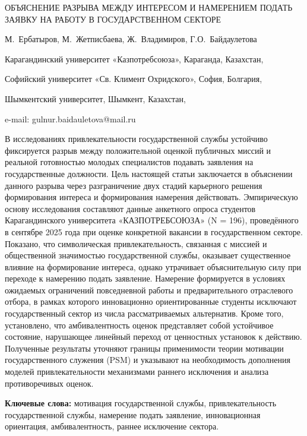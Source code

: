 \begin{header}
ОБЪЯСНЕНИЕ РАЗРЫВА МЕЖДУ ИНТЕРЕСОМ И НАМЕРЕНИЕМ ПОДАТЬ ЗАЯВКУ НА РАБОТУ В ГОСУДАРСТВЕННОМ СЕКТОРЕ

М.~Ербатыров,
М.~Жетписбаева,
Ж.~Владимиров,
Г.О.~Байдаулетова\envelope
\end{header}

\begin{affil}
Карагандинский университет «Казпотребсоюза», Караганда, Казахстан,

Софийский университет «Св. Климент Охридского», София, Болгария,

Шымкентский университет, Шымкент, Казахстан,

e-mail: gulnur.baidauletova@mail.ru
\end{affil}

В исследованиях привлекательности государственной службы устойчиво
фиксируется разрыв между положительной оценкой публичных миссий и
реальной готовностью молодых специалистов подавать заявления на
государственные должности. Цель настоящей статьи заключается в
объяснении данного разрыва через разграничение двух стадий карьерного
решения формирования интереса и формирования намерения действовать.
Эмпирическую основу исследования составляют данные анкетного опроса
студентов Карагандинского университета «КАЗПОТРЕБСОЮЗА» (N = 196),
проведённого в сентябре 2025 года при оценке конкретной вакансии в
государственном секторе. Показано, что символическая привлекательность,
связанная с миссией и общественной значимостью государственной службы,
оказывает существенное влияние на формирование интереса, однако
утрачивает объяснительную силу при переходе к намерению подать
заявление. Намерение формируется в условиях ожидаемых ограничений
повседневной работы и предварительного отраслевого отбора, в рамках
которого инновационно ориентированные студенты исключают государственный
сектор из числа рассматриваемых альтернатив. Кроме того, установлено,
что амбивалентность оценок представляет собой устойчивое состояние,
нарушающее линейный переход от ценностных установок к действию.
Полученные результаты уточняют границы применимости теории мотивации
государственного служения (PSM) и указывают на необходимость дополнения
моделей привлекательности механизмами раннего исключения и анализа
противоречивых оценок.

{\bfseries Ключевые слова:} мотивация государственной службы,
привлекательность государственной службы, намерение подать заявление,
инновационная ориентация, амбивалентность, раннее исключение сектора.


